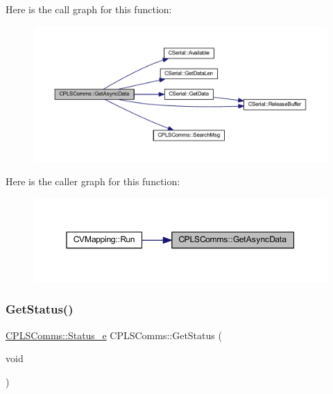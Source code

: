 Here is the call graph for this function\+:
\nopagebreak
\begin{figure}[H]
\begin{center}
\leavevmode
\includegraphics[width=350pt]{class_c_p_l_s_comms_a3124eaa4549706962c7024c7c97e82b0_cgraph}
\end{center}
\end{figure}
Here is the caller graph for this function\+:
\nopagebreak
\begin{figure}[H]
\begin{center}
\leavevmode
\includegraphics[width=350pt]{class_c_p_l_s_comms_a3124eaa4549706962c7024c7c97e82b0_icgraph}
\end{center}
\end{figure}
\mbox{\label{class_c_p_l_s_comms_a05149da99ab80b804699763111315f33}} 
\subsubsection{\texorpdfstring{GetStatus()}{GetStatus()}}
{\footnotesize\ttfamily \mbox{\hyperlink{class_c_p_l_s_comms_a765bc36363f75f4faf4fd2b41d440159}{C\+P\+L\+S\+Comms\+::\+Status\+\_\+e}} C\+P\+L\+S\+Comms\+::\+Get\+Status (\begin{DoxyParamCaption}\item[{void}]{ }\end{DoxyParamCaption})}



